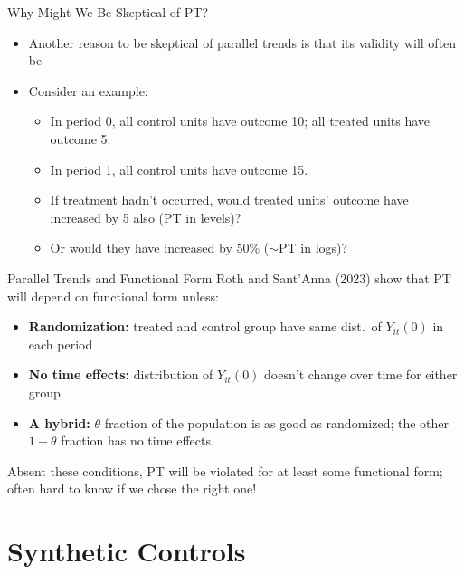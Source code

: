\documentclass[11pt,aspectratio=169]{beamer}
\begin{document}
\begin{frame}{Why Might We Be Skeptical of PT?}
\begin{itemize}
  \item Another reason to be skeptical of parallel trends is that its validity will often be 
  \item Consider an example:
  \begin{itemize}
    \item In period 0, all control units have outcome 10; all treated units have outcome 5.
    \item In period 1, all control units have outcome 15.
    \item If treatment hadn't occurred, would treated units' outcome have increased by 5 also (PT in levels)?
    \item Or would they have increased by 50\% ($\sim$PT in logs)?
  \end{itemize}
\end{itemize}
\end{frame}

\begin{frame}{Parallel Trends and Functional Form}
Roth and Sant'Anna (2023) show that PT will depend on functional form unless:
\begin{itemize}
  \item \textbf{Randomization:} treated and control group have same dist.\ of $Y_{it}(0)$ in each period
  \item \textbf{No time effects:} distribution of $Y_{it}(0)$ doesn't change over time for either group
  \item \textbf{A hybrid:} $\theta$ fraction of the population is as good as randomized; the other $1-\theta$ fraction has no time effects.
\end{itemize}
\begin{warningbox}[Warning]
Absent these conditions, PT will be violated for at least some functional form; often hard to know if we chose the right one!
\end{warningbox}
\end{frame}


\section{Synthetic Controls}
\end{document}

